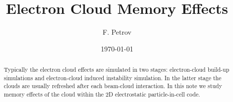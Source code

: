 \documentclass[5p]{elsarticle}%
\begin{document}
\title{Electron Cloud Memory Effects}
\author{F. Petrov}
\address[tudtemf]{Institut f\"ur Theorie Elektromagnetischer Felder (TEMF), Technische Universit\"{a}t Darmstadt,
Schlo{\ss}gartenstr. 8 64289 Darmstadt}
\date{\today}
\begin{abstract}
Typically the electron cloud effects are simulated in two stages: electron-cloud build-up simulations and electron-cloud induced instability simulation. In the latter stage the clouds are usually refreshed after each beam-cloud interaction. In this note we study memory effects of the cloud within the 2D electrostatic particle-in-cell code.
\end{abstract}


\maketitle
\end{document}
